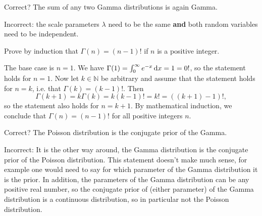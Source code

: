 \documentclass[assignments]{subfiles}
\begin{document}
\begin{exercise}
Correct? The sum of any two Gamma distributions is again Gamma.
\begin{solution}
Incorrect: the scale parameters $\lambda$ need to be the same \textbf{and} both random variables need to be independent.
\end{solution}
\end{exercise}




\begin{exercise}
Prove by induction that $\Gamma(n)=(n-1)!$ if $n$ is a positive integer.

\begin{solution}
The base case is $n=1$. We have $\Gamma(1) = \int_0^\infty e^{-x} \,\textrm{d}x = 1 = 0!$, so the statement holds for $n=1$. Now let $k \in \mathbb N$ be arbitrary and assume that the statement holds for $n=k$, i.e. that $\Gamma(k) = (k-1)!$. Then \begin{equation}\Gamma(k+1) = k\Gamma(k) = k (k-1)! = k! = ((k+1)-1)!,
\end{equation}
so the statement also holds for $n=k+1$. By mathematical induction, we conclude that  $\Gamma(n)=(n-1)!$ for all positive integers $n$.
\end{solution}
\end{exercise}

\begin{exercise}
Correct? The Poisson distribution is the conjugate prior of the Gamma.
\begin{solution}
Incorrect: It is the other way around, the Gamma distribution is the conjugate prior of the Poisson distribution. This statement doesn't make much sense, for example one would need to say for which parameter of the Gamma distribution it is the prior. In addition, the parameters of the Gamma distribution can be any positive real number, so the conjugate prior of (either parameter) of the Gamma distribution is a continuous distribution, so in particular not the Poisson distribution.
\end{solution}
\end{exercise}
\end{document}
